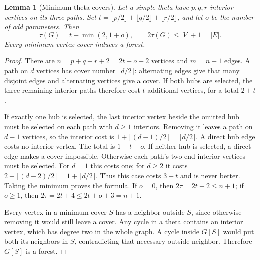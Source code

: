 \documentclass[11pt]{article}
\newtheorem{lemma}[theorem]{Lemma}
\theoremstyle{definition}
\theoremstyle{remark}
\begin{document}
\begin{lemma}[Minimum theta covers]\label{lem:thetacovers}
Let a simple theta have $p,q,r$ interior vertices on its three paths.
Set $t=\lfloor p/2\rfloor+\lfloor q/2\rfloor+\lfloor r/2\rfloor$,
and let $o$ be the number of odd parameters. Then
\[
 \tau(G)=t+\min(2,1+o),\qquad 2\tau(G)\le |V|+1=|E|.
\]
Every minimum vertex cover induces a forest.
\end{lemma}
\begin{proof}
There are $n=p+q+r+2=2t+o+2$ vertices and $m=n+1$ edges.
A path on $d$ vertices has cover number $\lfloor d/2\rfloor$: alternating
edges give that many disjoint edges and alternating vertices give a cover.
If both hubs are selected, the three remaining interior paths therefore
cost $t$ additional vertices, for a total $2+t$.

If exactly one hub is selected, the last interior vertex beside the omitted
hub must be selected on each path with $d\ge1$ interiors. Removing it
leaves a path on $d-1$ vertices, so the interior cost is
$1+\lfloor(d-1)/2\rfloor=\lceil d/2\rceil$. A direct hub edge costs no
interior vertex. The total is $1+t+o$.
If neither hub is selected, a direct edge makes a cover impossible.
Otherwise each path's two end interior vertices must be selected. For
$d=1$ this costs one; for $d\ge2$ it costs
$2+\lfloor(d-2)/2\rfloor=1+\lfloor d/2\rfloor$.
Thus this case costs $3+t$ and is never better. Taking the minimum proves
the formula. If $o=0$, then $2\tau=2t+2\le n+1$; if $o\ge1$, then
$2\tau=2t+4\le2t+o+3=n+1$.

Every vertex in a minimum cover $S$ has a neighbor outside $S$, since
otherwise removing it would still leave a cover. Any cycle in a theta
contains an interior vertex, which has degree two in the whole graph.
A cycle inside $G[S]$ would put both its neighbors in $S$, contradicting
that necessary outside neighbor. Therefore $G[S]$ is a forest.
\end{proof}
\end{document}
